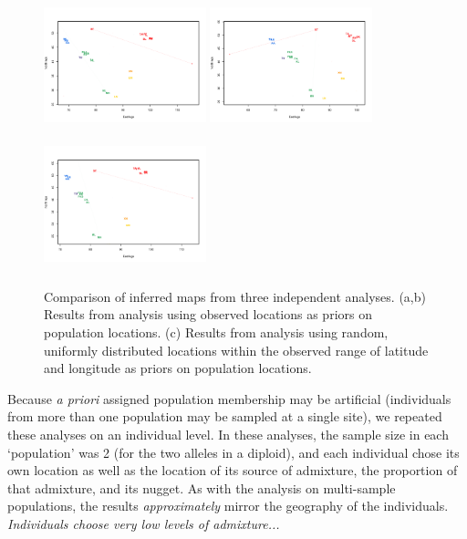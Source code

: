 \documentclass[12pt]{article}
\newcommand{\gc}[1]{{\em \color{blue} #1}}
\begin{document}
\begin{figure}
	\centering
		\subcaptionbox{\label{warb_pop_realpr1}}
			{\includegraphics[width=1.85in,height=1.54in]{figs/warblers/population_warbler_map_realpr1.png}}
		\subcaptionbox{\label{warb_pop_realpr2}}			
			{\includegraphics[width=1.85in,height=1.54in]{figs/warblers/population_warbler_map_realpr2.png}}
		\subcaptionbox{\label{warb_pop_randpr1}}
			{\includegraphics[width=1.85in,height=1.54in]{figs/warblers/population_warbler_map_randpr1.png}}
	\caption{Comparison of inferred maps from three independent analyses.  (a,b) Results from analysis using observed locations as priors on population locations.  (c) Results from analysis using random, uniformly distributed locations within the observed range of latitude and longitude as priors on population locations.}\label{sfig:warbler_pop_compare}
\end{figure}

Because \textit{a priori} assigned population membership may be artificial (individuals from more than one population may be sampled at a single site), we repeated these analyses on an individual level.  In these analyses, the sample size in each `population' was 2 (for the two alleles in a diploid), and each individual chose its own location as well as the location of its source of admixture, the proportion of that admixture, and its nugget.  As with the analysis on multi-sample populations, the results \gc{approximately} mirror the geography of the individuals.  \gc{Individuals choose very low levels of admixture...}
\end{document}
